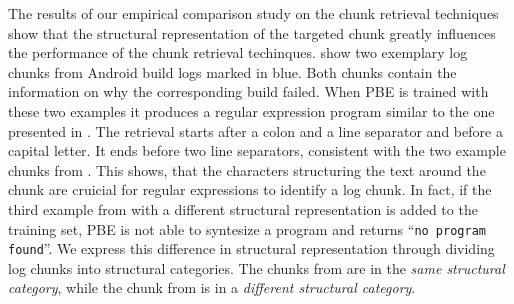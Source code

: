 The results of our empirical comparison study on the chunk retrieval
techniques
show that the structural representation of the targeted chunk greatly
influences
the performance of the chunk retrieval techinques.
 show two exemplary
log chunks from Android build logs marked in blue.
Both chunks contain the information on why the
corresponding build failed.
When PBE is trained with these two examples it produces
a regular expression program similar to the one presented in
.
The retrieval
starts after a colon and a line separator and before a capital
letter.
It ends before two line separators, consistent with the two example
chunks from .
This shows, that the characters structuring the text around the chunk are
cruicial for regular expressions to identify a log chunk.
In fact, if the third example from  with a
different structural representation is added to the training set,
PBE is not able to syntesize a program and returns
``\texttt{no program found}''.
We express this difference in structural representation through
dividing log chunks into structural categories.
The chunks from 
are in the \emph{same structural category}, while the chunk from
 is in a \emph{different structural category}.




